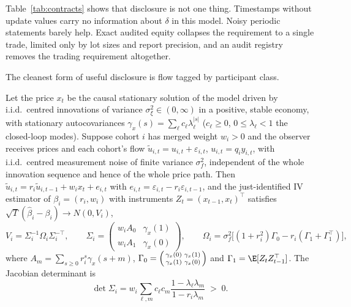 Table~\ref{tab:contracts} shows that disclosure is not one thing. Timestamps without update values carry no information about $\delta$ in this model. Noisy periodic statements barely help. Exact audited equity collapses the requirement to a single trade, limited only by lot sizes and report precision, and an audit registry removes the trading requirement altogether.

The cleanest form of useful disclosure is flow tagged by participant class.

\begin{proposition}\label{prop:tagged}
Let the price $x_t$ be the causal stationary solution of the model driven by i.i.d.\ centred innovations of variance $\sigma_\xi^2\in(0,\infty)$ in a positive, stable economy, with stationary autocovariances $\gamma_x(s)=\sum_\ell c_\ell\lambda_\ell^{|s|}$ ($c_\ell\ge0$, $0\le\lambda_\ell<1$ the closed-loop modes). Suppose cohort $i$ has merged weight $w_i>0$ and the observer receives prices and each cohort's flow $\tilde u_{i,t}=u_{i,t}+\varepsilon_{i,t}$, $u_{i,t}=q_iy_{i,t}$, with i.i.d.\ centred measurement noise of finite variance $\sigma_f^2$, independent of the whole innovation sequence and hence of the whole price path. Then $\tilde u_{i,t}=r_i\tilde u_{i,t-1}+w_ix_t+e_{i,t}$ with $e_{i,t}=\varepsilon_{i,t}-r_i\varepsilon_{i,t-1}$, and the just-identified IV estimator of $\beta_i=(r_i,w_i)$ with instruments $Z_t=(x_{t-1},x_t)^\top$ satisfies $\sqrt T(\hat\beta_i-\beta_i)\to N(0,V_i)$,
\begin{equation}\label{eq:ivvar}
V_i=\Sigma_i^{-1}\Omega_i\Sigma_i^{-\top},\qquad \Sigma_i=\begin{pmatrix}w_iA_0&\gamma_x(1)\\ w_iA_1&\gamma_x(0)\end{pmatrix},\qquad \Omega_i=\sigma_f^2\bigl[(1+r_i^2)\Gamma_0-r_i(\Gamma_1+\Gamma_1^\top)\bigr],
\end{equation}
where $A_m=\sum_{s\ge0}r_i^s\gamma_x(s+m)$, $\Gamma_0=\begin{psmallmatrix}\gamma_x(0)&\gamma_x(1)\\ \gamma_x(1)&\gamma_x(0)\end{psmallmatrix}$ and $\Gamma_1=\E[Z_tZ_{t-1}^\top]$. The Jacobian determinant is
\begin{equation}\label{eq:ivdet}
\det\Sigma_i=w_i\sum_{\ell,m}c_\ell c_m\frac{1-\lambda_\ell\lambda_m}{1-r_i\lambda_m}\;>\;0 .
\end{equation}

\end{proposition}
